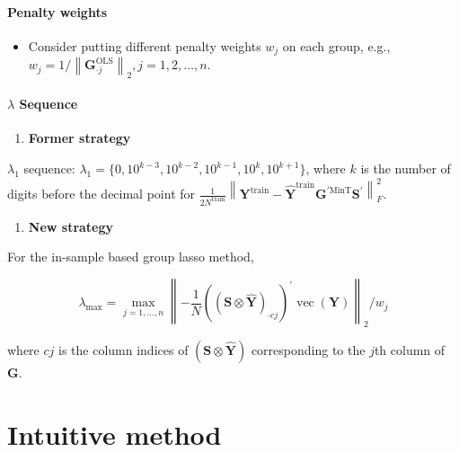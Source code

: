 \documentclass[
  letterpaper,
  DIV=11,
  numbers=noendperiod]{scrartcl}
\let\oldparagraph\paragraph
\renewcommand{\paragraph}[1]{\oldparagraph{#1}\mbox{}}
\providecommand{\tightlist}{%
  \setlength{\itemsep}{0pt}\setlength{\parskip}{0pt}}\usepackage{longtable,booktabs,array}
\begin{document}
\hypertarget{penalty-weights-1}{%
\paragraph{Penalty weights}\label{penalty-weights-1}}

\begin{itemize}
\tightlist
\item
  Consider putting different penalty weights \(w_j\) on each group,
  e.g.,
  \(w_j = 1/\left\|\boldsymbol{G}_{\cdot j}^{\text{OLS}}\right\|_2, j = 1,2,\ldots,n\).
\end{itemize}

\hypertarget{lambda-sequence-1}{%
\paragraph{\texorpdfstring{\(\lambda\)
Sequence}{\textbackslash lambda Sequence}}\label{lambda-sequence-1}}

\begin{enumerate}
\def\labelenumi{\arabic{enumi}.}
\tightlist
\item
  \textbf{Former strategy}
\end{enumerate}

\(\lambda_1\) sequence:
\(\lambda_1 = \{0, 10^{k-3}, 10^{k-2}, 10^{k-1}, 10^{k}, 10^{k+1}\}\),
where \(k\) is the number of digits before the decimal point for
\(\frac{1}{2 N^{\text{train}}}\left\|\boldsymbol{Y}^{\text{train}}-\hat{\boldsymbol{Y}}^{\text{train}} \boldsymbol{G}^{\prime\text{MinT}} \boldsymbol{S}^{\prime}\right\|_F^2\).

\begin{enumerate}
\def\labelenumi{\arabic{enumi}.}
\setcounter{enumi}{1}
\tightlist
\item
  \textbf{New strategy}
\end{enumerate}

For the in-sample based group lasso method,

\[
\lambda_{\max}=\max _{j=1, \ldots, n}\left\|-\frac{1}{N}\left(\left(\boldsymbol{S} \otimes \hat{\boldsymbol{Y}}\right)_{\cdot cj}\right)^{\prime} \operatorname{vec}(\boldsymbol{Y})\right\|_2 / w_j
\]

where \(cj\) is the column indices of
\((\boldsymbol{S} \otimes \hat{\boldsymbol{Y}})\) corresponding to the
\(j\)th column of \(\boldsymbol{G}\).

\hypertarget{intuitive-method}{%
\section{Intuitive method}\label{intuitive-method}}
\end{document}

